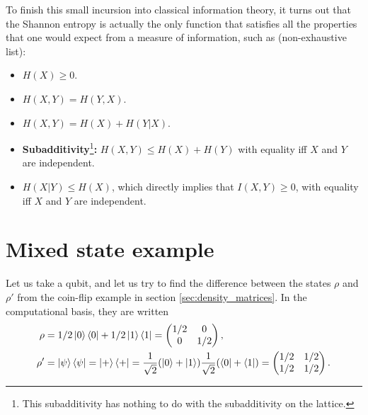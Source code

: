 To finish this small incursion into classical information theory, it turns out that the Shannon entropy is actually the only function that satisfies all the properties that one would expect from a measure of information, such as (non-exhaustive list):

\begin{itemize}
    \item $H(X) \geq 0$.
    \item $H(X, Y) = H(Y, X)$.
    \item $H(X, Y) = H(X) + H(Y|X)$.
    \item \textbf{Subadditivity}\footnote{This subadditivity has nothing to do with the subadditivity on the lattice.}\textbf{:} $H(X, Y) \leq H(X) + H(Y)$ with equality iff $X$ and $Y$ are independent.
    \item $H(X|Y) \leq H(X)$, which directly implies that $I(X, Y) \geq 0$, with equality iff $X$ and $Y$ are independent.
\end{itemize}



\newpage

\section{Mixed state example}
\label{app:mixed_example}

\setcounter{equation}{0}

Let us take a qubit, and let us try to find the difference between the states $\rho$ and $\rho'$ from the coin-flip example in section \ref{sec:density_matrices}. In the computational basis, they are written
\begin{align}
    \rho &= 1/2 \ket{0}\bra{0} + 1/2 \ket{1}\bra{1} = \left(\begin{matrix}
        1/2 & 0\\
        0 & 1/2
    \end{matrix}\right),\\
    \rho' &= \ket{\psi}\bra{\psi} = \ket{+}\bra{+} = \frac{1}{\sqrt{2}}(\ket{0} + \ket{1})\frac{1}{\sqrt{2}}(\bra{0} + \bra{1}) = \left(\begin{matrix}
        1/2 & 1/2\\
        1/2 & 1/2
    \end{matrix}\right).
\end{align}

